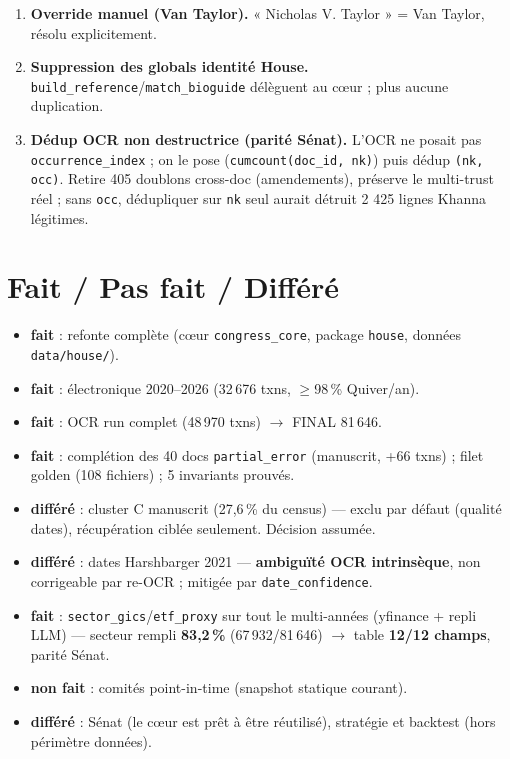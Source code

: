 \documentclass[11pt,a4paper]{article}
\newcommand{\xfait}{\textcolor{green!50!black}{\textbf{fait}}}
\newcommand{\xnon}{\textcolor{red!70!black}{\textbf{non fait}}}
\newcommand{\xdif}{\textcolor{orange!80!black}{\textbf{différé}}}
\begin{document}
\begin{enumerate}[nosep,leftmargin=1.5em]
\item \textbf{Override manuel (Van Taylor).} « Nicholas V. Taylor » = Van Taylor, résolu explicitement.
\item \textbf{Suppression des globals identité House.} \texttt{build\_reference}/\texttt{match\_bioguide} délèguent au cœur ; plus aucune duplication.
\item \textbf{Dédup OCR non destructrice (parité Sénat).} L'OCR ne posait pas \texttt{occurrence\_index} ; on le pose (\texttt{cumcount(doc\_id, nk)}) puis dédup \texttt{(nk, occ)}. Retire 405 doublons cross-doc (amendements), préserve le multi-trust réel ; sans \texttt{occ}, dédupliquer sur \texttt{nk} seul aurait détruit 2 425 lignes Khanna légitimes.
\end{enumerate}

\section{Fait / Pas fait / Différé}
\begin{itemize}[nosep,leftmargin=1.3em]
\item \xfait{} : refonte complète (cœur \texttt{congress\_core}, package \texttt{house}, données \texttt{data/house/}).
\item \xfait{} : électronique 2020--2026 (32\,676 txns, $\geq$98\,\% Quiver/an).
\item \xfait{} : OCR run complet (48\,970 txns) $\rightarrow$ FINAL 81\,646.
\item \xfait{} : complétion des 40 docs \texttt{partial\_error} (manuscrit, +66 txns) ; filet golden (108 fichiers) ; 5 invariants prouvés.
\item \xdif{} : cluster C manuscrit (27,6\,\% du census) --- exclu par défaut (qualité dates), récupération ciblée seulement. Décision assumée.
\item \xdif{} : dates Harshbarger 2021 --- \textbf{ambiguïté OCR intrinsèque}, non corrigeable par re-OCR ; mitigée par \texttt{date\_confidence}.
\item \xfait{} : \texttt{sector\_gics}/\texttt{etf\_proxy} sur tout le multi-années (yfinance + repli LLM) --- secteur rempli \textbf{83,2\,\%} (67\,932/81\,646) $\rightarrow$ table \textbf{12/12 champs}, parité Sénat.
\item \xnon{} : comités point-in-time (snapshot statique courant).
\item \xdif{} : Sénat (le cœur est prêt à être réutilisé), stratégie et backtest (hors périmètre données).
\end{itemize}
\end{document}
